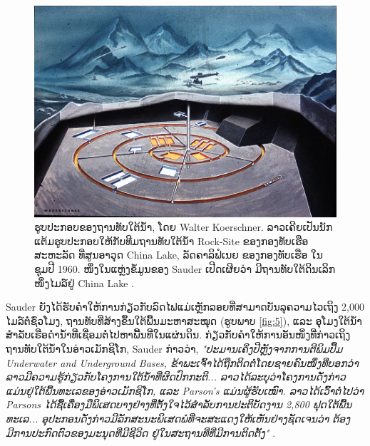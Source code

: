\documentclass[10pt,twocolumn,letterpaper]{article}
\begin{document}
\begin{figure}[t]
\begin{center}
   \includegraphics[width=1\linewidth]{undersea.jpg}
\end{center}
   \caption{ຮູບປະກອບຂອງຖານທັບໃຕ້ນ້ຳ, ໂດຍ Walter Koerschner.
ລາວເຄີຍເປັນນັກແຕ້ມຮູບປະກອບໃຫ້ກັບທີມຖານທັບໃຕ້ນ້ຳ Rock-Site ຂອງກອງທັບເຮືອສະຫະລັດ ທີ່ສູນອາວຸດ China Lake, ລັດຄາລິຟໍເນຍ ຂອງກອງທັບເຮືອ ໃນຊຸມປີ 1960. ໜຶ່ງໃນແຫຼ່ງຂໍ້ມູນຂອງ Sauder ເປີດເຜີຍວ່າ ມີຖານທັບໃຕ້ດິນເລິກໜຶ່ງໄມລ໌ຢູ່ China Lake \cite{22,23}. \cite{120}}
\label{fig:5}
\label{fig:onecol}
\end{figure}

Sauder ຍັງໄດ້ຮັບຄໍາໃຫ້ການກ່ຽວກັບລົດໄຟແມ່ເຫຼັກລອຍທີ່ສາມາດບັນລຸຄວາມໄວເຖິງ 2,000 ໄມລ໌ຕໍ່ຊົ່ວໂມງ, ຖານທັບທີ່ສ້າງຂຶ້ນໃຕ້ພື້ນມະຫາສະໝຸດ (ຮູບພາບ \ref{fig:5}), ແລະ ອຸໂມງໃຕ້ນ້ຳສຳລັບເຮືອດຳນ້ຳທີ່ເຊື່ອມຕໍ່ໄປຫາພື້ນທີ່ໃນແຜ່ນດິນ.
ກ່ຽວກັບຄຳໃຫ້ການອັນໜຶ່ງທີ່ກ່າວເຖິງຖານທັບໃຕ້ນ້ຳໃນອ່າວເມັກຊິໂກ, Sauder ກ່າວວ່າ, \textit{"ປະມານເຄິ່ງປີຫຼັງຈາກການຕີພິມປຶ້ມ Underwater and Underground Bases, ຂ້າພະເຈົ້າໄດ້ຖືກຕິດຕໍ່ໂດຍຊາຍຄົນໜຶ່ງທີ່ບອກວ່າ ລາວມີຄວາມຮູ້ກ່ຽວກັບໂຄງການໃຕ້ນ້ຳທີ່ຜິດປົກກະຕິ... ລາວໄດ້ລະບຸວ່າໂຄງການດັ່ງກ່າວແມ່ນຢູ່ໃຕ້ພື້ນທະເລຂອງອ່າວເມັກຊິໂກ, ແລະ Parson's ແມ່ນຜູ້ຮັບເໝົາ. ລາວໄດ້ເວົ້າຕໍ່ໄປວ່າ Parsons ໄດ້ຊື້ເຄື່ອງມືພິເສດບາງຢ່າງທີ່ຕັ້ງໃຈໄວ້ສໍາລັບການປະຕິບັດງານ 2,800 ຟຸດໃຕ້ພື້ນທະເລ... ອຸປະກອນດັ່ງກ່າວມີລັກສະນະພິເສດພໍທີ່ຈະສະແດງໃຫ້ເຫັນຢ່າງຊັດເຈນວ່າ ຕ້ອງມີການປະກົດຕົວຂອງມະນຸດທີ່ມີຊີວິດ \cite{121} ຢູ່ໃນສະຖານທີ່ທີ່ມີການຕິດຕັ້ງ"} \cite{22}. \cite{122}
\end{document}

